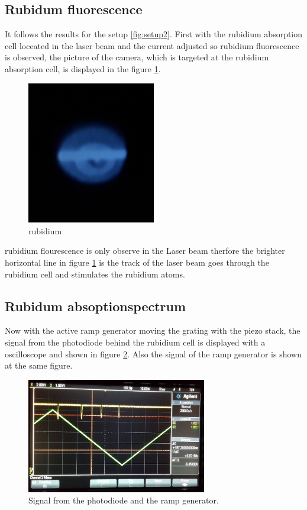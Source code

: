 \subsection{Rubidum fluorescence}
\label{subsec:RB_fluorescence}

It follows the results for the setup \ref{fig:setup2}.
First with the rubidium absorption cell loceated in the laser beam
and the current adjusted so rubidium fluorescence is observed, the picture of the
camera, which is targeted at the
rubidium absorption cell, is
displayed in the figure \ref{fig:Floures}.

\begin{figure}
  \centering
  \includegraphics[width = 0.5\textwidth]{figures/Rb_leuchten.jpg}
  \caption{rubidium }
  \label{fig:Floures}
\end{figure}

rubidium flourescence is only observe in the Laser beam therfore
the brighter horizontal line
in figure \ref{fig:Floures}
is the track of the laser beam
goes through the rubidium cell and stimulates the rubidium atoms.

\subsection{Rubidum absoptionspectrum}
\label{subsec:Rubidum_absoptionspectrum}


Now with the active ramp generator moving the grating with the piezo stack,
the signal from the photodiode behind the rubidium cell
is displayed with a
oscilloscope and shown in figure \ref{fig:ramp}.
Also the signal of the ramp generator is shown at the same
figure.

\begin{figure}
  \centering
  \includegraphics[width = 0.7\textwidth]{figures/Ramp.jpg}
  \caption{Signal from the photodiode and the ramp generator.}
  \label{fig:ramp}
\end{figure}

